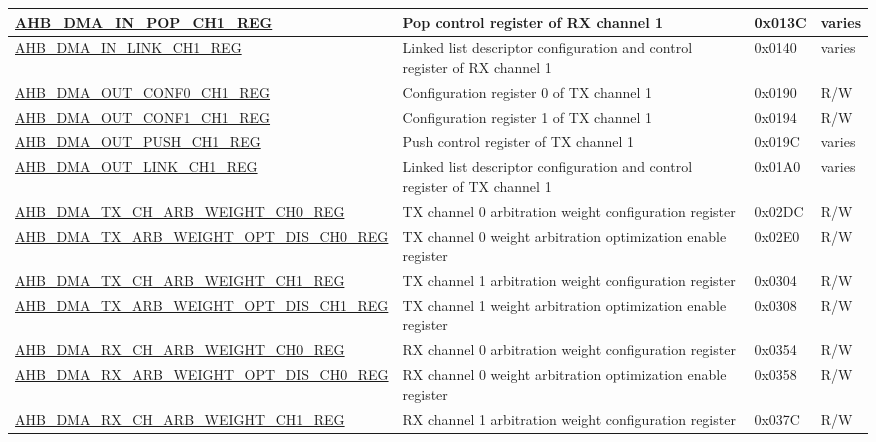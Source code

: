 \begin{longtable}{ | p{8cm} | p{8cm} | p{1.3cm} | p{1.5cm} | }
\hyperref[regdesc:AHBDMAINPOPCHNREG]{AHB\_DMA\_IN\_POP\_CH1\_REG} & Pop control register of RX channel 1 & 0x013C & varies \\ \hline
\hyperref[regdesc:AHBDMAINLINKCHNREG]{AHB\_DMA\_IN\_LINK\_CH1\_REG} & Linked list descriptor configuration and control register of RX channel 1 & 0x0140 & varies \\ \hline
\hyperref[regdesc:AHBDMAOUTCONF0CHNREG]{AHB\_DMA\_OUT\_CONF0\_CH1\_REG} & Configuration register 0 of TX channel 1 & 0x0190 & R/W \\ \hline
\hyperref[regdesc:AHBDMAOUTCONF1CHNREG]{AHB\_DMA\_OUT\_CONF1\_CH1\_REG} & Configuration register 1 of TX channel 1 & 0x0194 & R/W \\ \hline
\hyperref[regdesc:AHBDMAOUTPUSHCHNREG]{AHB\_DMA\_OUT\_PUSH\_CH1\_REG} & Push control register of TX channel 1 & 0x019C & varies \\ \hline
\hyperref[regdesc:AHBDMAOUTLINKCHNREG]{AHB\_DMA\_OUT\_LINK\_CH1\_REG} & Linked list descriptor configuration and control register of TX channel 1 & 0x01A0 & varies \\ \hline
\hyperref[regdesc:AHBDMATXCHARBWEIGHTCHNREG]{AHB\_DMA\_TX\_CH\_ARB\_WEIGHT\_CH0\_REG} & TX channel 0 arbitration weight configuration register & 0x02DC & R/W \\ \hline
\hyperref[regdesc:AHBDMATXARBWEIGHTOPTDISCHNREG]{AHB\_DMA\_TX\_ARB\_WEIGHT\_OPT\_DIS\_CH0\_REG} & TX channel 0 weight arbitration optimization enable register & 0x02E0 & R/W \\ \hline
\hyperref[regdesc:AHBDMATXCHARBWEIGHTCHNREG]{AHB\_DMA\_TX\_CH\_ARB\_WEIGHT\_CH1\_REG} & TX channel 1 arbitration weight configuration register & 0x0304 & R/W \\ \hline
\hyperref[regdesc:AHBDMATXARBWEIGHTOPTDISCHNREG]{AHB\_DMA\_TX\_ARB\_WEIGHT\_OPT\_DIS\_CH1\_REG} & TX channel 1 weight arbitration optimization enable register & 0x0308 & R/W \\ \hline
\hyperref[regdesc:AHBDMARXCHARBWEIGHTCHNREG]{AHB\_DMA\_RX\_CH\_ARB\_WEIGHT\_CH0\_REG} & RX channel 0 arbitration weight configuration register & 0x0354 & R/W \\ \hline
\hyperref[regdesc:AHBDMARXARBWEIGHTOPTDISCHNREG]{AHB\_DMA\_RX\_ARB\_WEIGHT\_OPT\_DIS\_CH0\_REG} & RX channel 0 weight arbitration optimization enable register & 0x0358 & R/W \\ \hline
\hyperref[regdesc:AHBDMARXCHARBWEIGHTCHNREG]{AHB\_DMA\_RX\_CH\_ARB\_WEIGHT\_CH1\_REG} & RX channel 1 arbitration weight configuration register & 0x037C & R/W \\ \hline

\end{longtable}
